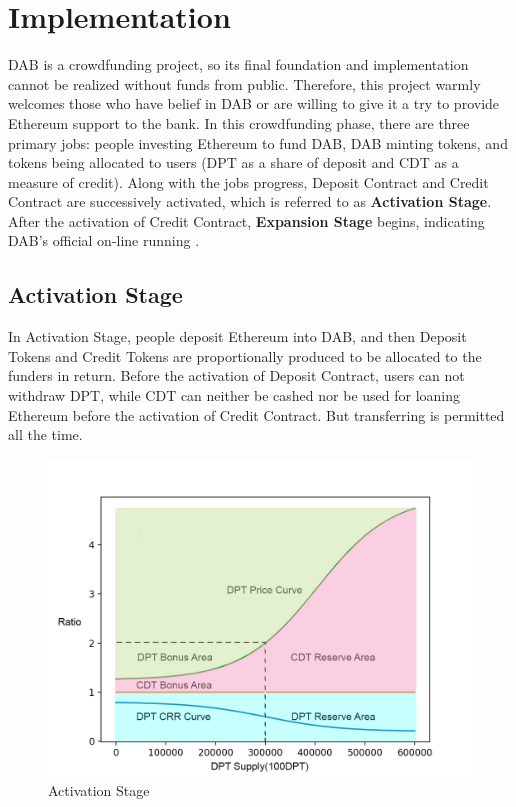 \documentclass[review]{elsarticle}
\begin{document}
\section{Implementation}
DAB is a crowdfunding project, so its final foundation and implementation cannot be realized without funds from public. Therefore, this project warmly welcomes those who have belief in DAB or are willing to give it a try to provide Ethereum support to the bank. 
In this crowdfunding phase, there are three primary jobs: people investing Ethereum to fund DAB, DAB minting tokens, and tokens being allocated to users (DPT as a share of deposit and CDT as a measure of credit). Along with the jobs progress, Deposit Contract and Credit Contract are successively activated, which is referred to as \textbf{Activation Stage}. After the activation of Credit Contract, \textbf{Expansion Stage} begins, indicating DAB's official on-line running .

\subsection{Activation Stage}
In Activation Stage, people deposit Ethereum into DAB, and then Deposit Tokens and Credit Tokens are proportionally produced to be allocated to the funders in return. Before the activation of Deposit Contract, users can not withdraw DPT, while CDT can neither be cashed nor be used for loaning Ethereum before the activation of Credit Contract. But transferring is permitted all the time.

\begin{figure}[H]
\begin{center}
\includegraphics[width=4.5in]{Graphs/Activation1.jpg}
\end{center}
\caption{Activation Stage}\label{AS}
\end{figure}
\end{document}
